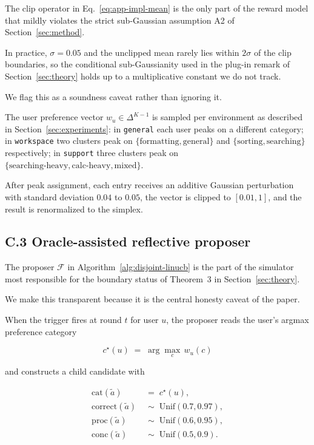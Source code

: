 \documentclass{article} %
\begin{document}
The clip operator in Eq.~\eqref{eq:app-impl-mean} is the only part of the reward model that mildly violates the strict sub-Gaussian assumption A2 of Section~\ref{sec:method}.

In practice, $\sigma = 0.05$ and the unclipped mean rarely lies within $2\sigma$ of the clip boundaries, so the conditional sub-Gaussianity used in the plug-in remark of Section~\ref{sec:theory} holds up to a multiplicative constant we do not track.

We flag this as a soundness caveat rather than ignoring it.

The user preference vector $w_u \in \Delta^{K-1}$ is sampled per environment as described in Section~\ref{sec:experiments}: in \texttt{general} each user peaks on a different category; in \texttt{workspace} two clusters peak on $\{\text{formatting}, \text{general}\}$ and $\{\text{sorting}, \text{searching}\}$ respectively; in \texttt{support} three clusters peak on $\{\text{searching}\text{-heavy}, \text{calc}\text{-heavy}, \text{mixed}\}$.

After peak assignment, each entry receives an additive Gaussian perturbation with standard deviation $0.04$ to $0.05$, the vector is clipped to $[0.01, 1]$, and the result is renormalized to the simplex.

\subsection{C.3 Oracle-assisted reflective proposer}

\label{app:impl-reflection}

The proposer $\mathcal{F}$ in Algorithm~\ref{alg:disjoint-linucb} is the part of the simulator most responsible for the boundary status of Theorem~3 in Section~\ref{sec:theory}.

We make this transparent because it is the central honesty caveat of the paper.

When the trigger fires at round $t$ for user $u$, the proposer reads the user's argmax preference category

\begin{equation}
\label{eq:app-impl-peak}
c^\star(u) \;=\; \arg\max_{c}\, w_u(c)
\end{equation}

and constructs a child candidate with

\begin{align}
\label{eq:app-impl-child-cat}
\mathrm{cat}(\tilde a) &\;=\; c^\star(u),\\
\label{eq:app-impl-child-q}
\mathrm{correct}(\tilde a) &\;\sim\; \mathrm{Unif}(0.7, 0.97),\\
\label{eq:app-impl-child-p}
\mathrm{proc}(\tilde a) &\;\sim\; \mathrm{Unif}(0.6, 0.95),\\
\label{eq:app-impl-child-c}
\mathrm{conc}(\tilde a) &\;\sim\; \mathrm{Unif}(0.5, 0.9).
\end{align}
\end{document}
